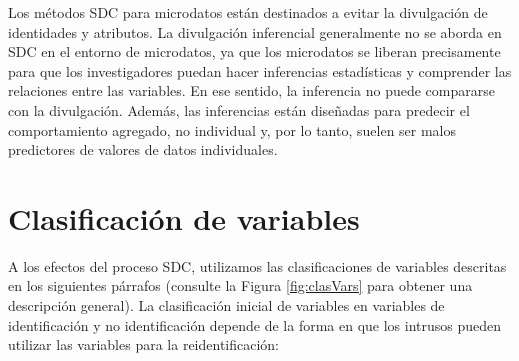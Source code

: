 \documentclass[
]{book}
\theoremstyle{definition}
\theoremstyle{definition}
\theoremstyle{definition}
\theoremstyle{definition}
\theoremstyle{remark}
\begin{document}
Los métodos SDC para microdatos están destinados a evitar la divulgación de identidades y atributos. La divulgación inferencial generalmente no se aborda en SDC en el entorno de microdatos, ya que los microdatos se liberan precisamente para que los investigadores puedan hacer inferencias estadísticas y comprender las relaciones entre las variables. En ese sentido, la inferencia no puede compararse con la divulgación. Además, las inferencias están diseñadas para predecir el comportamiento agregado, no individual y, por lo tanto, suelen ser malos predictores de valores de datos individuales.

\hypertarget{clasificaciuxf3n-de-variables}{%
\section{Clasificación de variables}\label{clasificaciuxf3n-de-variables}}

A los efectos del proceso SDC, utilizamos las clasificaciones de variables descritas en los siguientes párrafos (consulte la Figura \ref{fig:clasVars} para obtener una descripción general). La clasificación inicial de variables en variables de identificación y no identificación depende de la forma en que los intrusos pueden utilizar las variables para la reidentificación:
\end{document}
